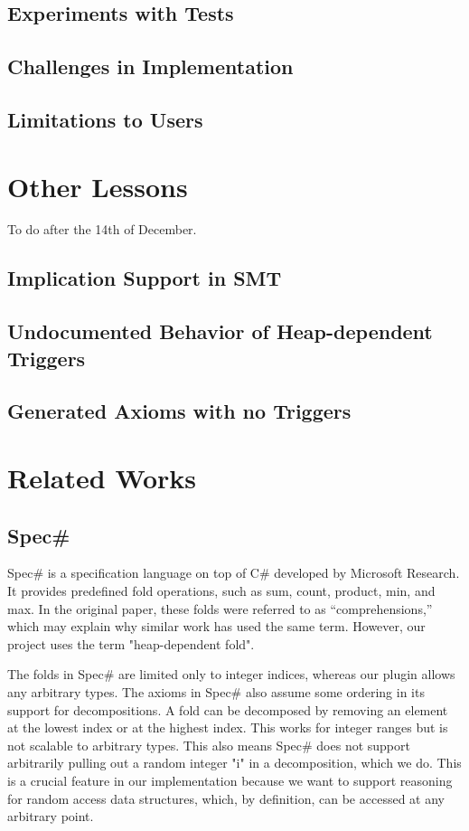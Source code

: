\documentclass[msc,oneside]{ubcthesis}
\theoremstyle{definition}
\begin{document}
\section{Experiments with Tests}

\section{Challenges in Implementation}

\section{Limitations to Users}

\chapter{Other Lessons}
To do after the 14th of December. 

\section{Implication Support in SMT}

\section{Undocumented Behavior of Heap-dependent Triggers}

\section{Generated Axioms with no Triggers}

\chapter{Related Works}
	

\section{Spec\#}
Spec\# is a specification language on top of C\# developed by Microsoft Research. It provides predefined fold operations, such as sum, count, product, min, and max. In the original paper, these folds were referred to as ``comprehensions,'' which may explain why similar work has used the same term. However, our project uses the term "heap-dependent fold".

The folds in Spec\# are limited only to integer indices, whereas our plugin allows any arbitrary types. The axioms in Spec\# also assume some ordering in its support for decompositions. A fold can be decomposed by removing an element at the lowest index or at the highest index. This works for integer ranges but is not scalable to arbitrary types. This also means Spec\# does not support arbitrarily pulling out a random integer "i" in a decomposition, which we do. This is a crucial feature in our implementation because we want to support reasoning for random access data structures, which, by definition, can be accessed at any arbitrary point.
\end{document}
